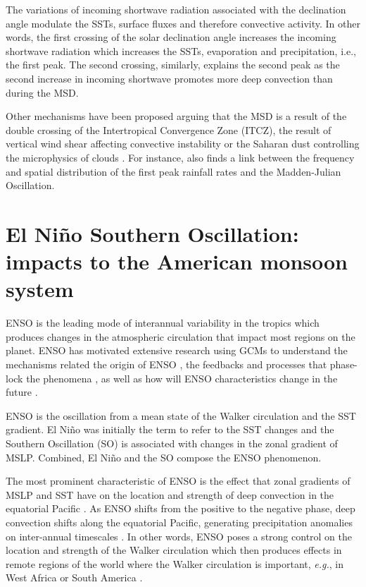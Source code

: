 The variations of incoming shortwave radiation associated with the declination angle modulate the SSTs, surface fluxes and therefore convective activity. In other words, the first crossing of the solar declination angle increases the incoming shortwave radiation which increases the SSTs, evaporation and precipitation, i.e., the first peak. The second crossing, similarly, explains the second peak as the second increase in incoming shortwave promotes more deep convection than during the MSD. 


Other mechanisms have been proposed arguing that the MSD is a result of the double crossing of the Intertropical Convergence Zone (ITCZ), the result of vertical wind shear affecting convective instability or the Saharan dust controlling  the microphysics of clouds \citep{angeles2010origins}.
For instance, \cite{perdigon2019} also finds a link between the frequency and spatial distribution of the first peak rainfall rates and the Madden-Julian Oscillation. 

\section{El Niño Southern Oscillation: impacts to the American monsoon system}
\label{sub:lit_enso}

 ENSO is the leading mode of interannual variability in the tropics which produces changes in the atmospheric circulation that impact most regions on the planet.
ENSO has motivated extensive research using GCMs to understand the mechanisms related the origin of ENSO \citep{christensen2017}, the feedbacks and processes that phase-lock the phenomena \citep{neelin1998}, as well as how will ENSO characteristics change in the future \citep{cai2015a,santoso2017}.

 ENSO is the oscillation from a mean state of the Walker circulation and the SST gradient. El Niño was initially the term to refer to the SST changes and the Southern Oscillation (SO) is associated with changes in the zonal gradient of MSLP. Combined, El Niño and the SO compose the ENSO phenomenon.
 
 The most prominent characteristic of ENSO is the effect that zonal gradients of MSLP and SST have on the location and strength of deep convection in the equatorial Pacific \citep{trenberth1997,neelin1998}. As ENSO shifts from the positive to the negative phase, deep convection shifts along the equatorial Pacific, generating precipitation anomalies on inter-annual timescales \citep{neelin1998,wang2004}. In other words, ENSO poses a strong control on the location and strength of the Walker circulation which then produces effects in remote regions of the world where the Walker circulation is important, \textit{e.g.}, in West Africa \citep{ropelewski1986,ropelewski1987} or South America \citep{sulca2018}.
 


